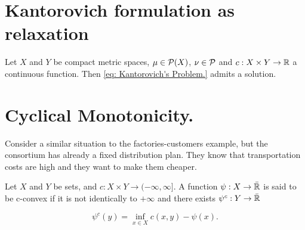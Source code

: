 \section{Kantorovich formulation as relaxation}

\begin{theorem}
	Let $X$ and $Y$ be compact metric spaces, $\mu \in \mathcal{P}(X)$, $\nu \in  \mathcal{P}$ and
	$c:X\times Y \rightarrow \mathbb{R}$  a continuous function. Then  \eqref{eq: Kantorovich's Problem.} admits a solution.
\end{theorem} 

\section{Cyclical Monotonicity.}

Consider a similar situation to the factories-customers example, but the consortium has already a fixed distribution plan. They know that transportation costs are high and they want to make them cheaper. 

\begin{definition}[c-transform]
	Let $X$ and $Y$ be sets, and $c:X\times Y \rightarrow (-\infty, \infty]$. A function $\psi: X\rightarrow \bar{\mathbb{R}}$ is said to be c-convex if it is not identically to $+\infty$ and there exists $\psi^c: Y \rightarrow \bar{\mathbb{R}}$
	
	\begin{equation}
		\psi^c(y)= \inf_{x\in X} c(x,y)-\psi(x).
	\end{equation}
\end{definition}

